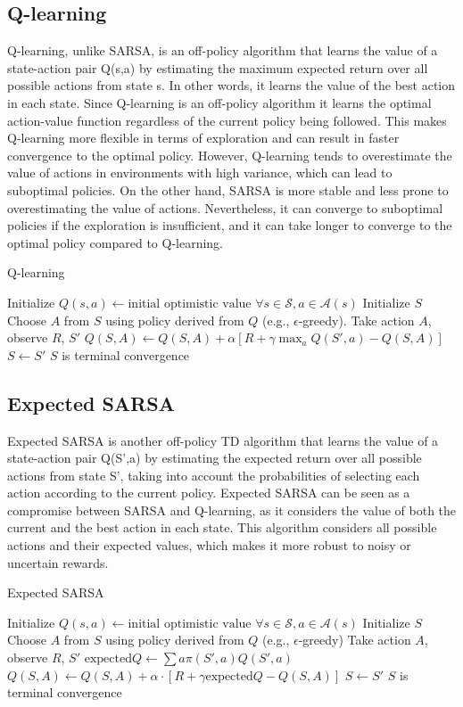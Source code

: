 \subsection{Q-learning}
Q-learning, unlike SARSA, is an off-policy algorithm that learns the value of a state-action pair Q(s,a) by estimating the maximum expected return over all possible actions from state s. In other words, it learns the value of the best action in each state. Since Q-learning is an off-policy algorithm it learns the optimal action-value function regardless of the current policy being followed. This makes Q-learning more flexible in terms of exploration and can result in faster convergence to the optimal policy. However, Q-learning tends to overestimate the value of actions in environments with high variance, which can lead to suboptimal policies. On the other hand, SARSA is more stable and less prone to overestimating the value of actions. Nevertheless, it can converge to suboptimal policies if the exploration is insufficient, and it can take longer to converge to the optimal policy compared to Q-learning.
\begin{algorithm}
\caption{Q-learning}\label{algo:QL}
\begin{algorithmic}[1]
\State Initialize 
\State $Q(s,a) \gets \text{initial optimistic value } \forall s\in \mathcal{S}, a\in \mathcal{A}(s)$
\Repeat
\State Initialize $S$
\State Choose $A$ from $S$ using policy derived from $Q$ (e.g., $\epsilon$-greedy).
\Repeat
\State Take action $A$, observe $R$, $S'$
\State $Q(S,A) \gets Q(S,A) + \alpha \left[R + \gamma \max_a Q(S',a) - Q(S,A)\right]$
\State $S \gets S'$
\Until $S$ is terminal
\Until convergence
\end{algorithmic}
\end{algorithm}

\subsection{Expected SARSA}
Expected SARSA is another off-policy TD algorithm that learns the value of a state-action pair Q(S',a) by estimating the expected return over all possible actions from state S', taking into account the probabilities of selecting each action according to the current policy. Expected SARSA can be seen as a compromise between SARSA and Q-learning, as it considers the value of both the current and the best action in each state. This algorithm considers all possible actions and their expected values, which makes it more robust to noisy or uncertain rewards. 
\begin{algorithm}
\caption{Expected SARSA}\label{algo:ES}
\begin{algorithmic}[1]
\State Initialize 
\State $Q(s,a) \gets \text{initial optimistic value } \forall s\in \mathcal{S}, a\in \mathcal{A}(s)$
\Repeat
\State Initialize $S$
\Repeat
\State Choose $A$ from $S$ using policy derived from $Q$ (e.g., $\epsilon$-greedy)
\State Take action $A$, observe $R$, $S'$
\State $\text{expected}Q \gets \sum{}{a} \pi(S',a) Q(S',a)$
\State $Q(S,A) \gets Q(S,A) + \alpha \cdot [R + \gamma\text{expected}Q - Q(S,A)]$
\State $S \gets S'$
\Until $S$ is terminal
\Until convergence
\end{algorithmic}
\end{algorithm}


